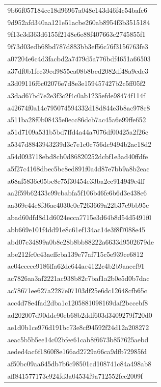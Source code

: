 \begin{tabular}{l}
9b66f057184cc18d96967a048e143d46f4c54bafc6 \\
9d952afd340aa121e51acbe260ab8954f3b3515184 \\
9f13c3d363d6155f2148e6e88f407663c2745855f1 \\
9f73d03edb68bd787d883bb3ef56c76f3156763fe3 \\
a07204e6c4d3facbd2a7479d5a776bdf4651a66503 \\
a37df0b1fec39ed9855ea08b8bed2082df48a9cde3 \\
a3d09116f6c02076e7d8e3e159457427b2c5ff05f2 \\
a3dad67bd7e2e3f3c2f4c0ab1235efde98474f114f \\
a42674f0a14c795074594332d18d844e3b8ac978c8 \\
a511ba28f0b08435e0ecc86dcb7ac45a6e99ffe652 \\
a51d7109a531b5bd7ffd4a44a7076df00425a2f26c \\
a5347d8843943239d3c7e1c0c756dc9494b2ac18d2 \\
a54d093718ebd8cb0d86820252dcbf1e3ad40ffdfe \\
a5f27c4168dbec5bc8ed891f0a4d87e7bb9a8b2eac \\
a68af5836c05bc8c75f30454e33ba2ee914949e4ff \\
aa2f59b62433c99cbabfa5f106b46fe6b6d3e438c6 \\
aa369e44e8f36ae4030e0e7263669a22b37e9bb95c \\
abad60dfd8d1d6024ecca7715e3d64b8d54d5491f0 \\
abb669e101f4dd91e8c61ef134ac14e3f8f7088e45 \\
abd07c34899a0b8e28b8bb88222a6633d9502679de \\
abe212fc0c43aeffcba139e77af715c5e939ce6812 \\
ac04cceee9186ffa62dc644ae4122c4b2b9aaecf91 \\
ac7826aa3af2221ac938b82c7baf1a2b0e5d0b7dac \\
ac78671ee627a2287e07103df25e6dc12648cfb65c \\
acc4d78e4fad2dba1c1205881098169daf2bccebf8 \\
ad202007d90dde90eb68b2ddf603d3409279f720d0 \\
ae1d0b1ce976d191bc73e8cf94592f24d12a208272 \\
aeac5b5b5ee14c02bfee61cab8f6673b857625aebd \\
aeded4ac6f1860f8e166ad2729a66ca9dfb72985fd \\
af50bc09aa645db7b6c98501cd108741c84a498ab8 \\
aff841577173c924fd3a04534f9a712552fce2009f \\

\end{tabular}
